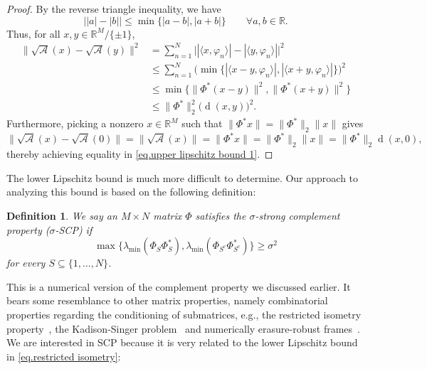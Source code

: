 \documentclass[times,10pt]{elsarticle}
\theoremstyle{plain}
\newtheorem{definition}[theorem]{Definition}
\begin{document}
\begin{proof}
By the reverse triangle inequality, we have
\begin{equation*}
\big||a|-|b|\big|
\leq\min\big\{|a-b|,|a+b|\big\}
\qquad
\forall a,b\in\mathbb{R}.
\end{equation*}
Thus, for all $x,y\in\mathbb{R}^M/\{\pm1\}$,
\begin{align}
\nonumber
\|\sqrt{\mathcal{A}}(x)-\sqrt{\mathcal{A}}(y)\|^2
&=\sum_{n=1}^N\big||\langle x,\varphi_n\rangle|-|\langle y,\varphi_n\rangle|\big|^2\\
\nonumber
&\leq\sum_{n=1}^N\bigg(\min\Big\{|\langle x-y,\varphi_n\rangle|,|\langle x+y,\varphi_n\rangle|\Big\}\bigg)^2\\
\nonumber
&\leq\min\Big\{\|\Phi^*(x-y)\|^2,\|\Phi^*(x+y)\|^2\Big\}\\
\label{eq.upper lipschitz bound 1}
&\leq\|\Phi^*\|_2^2\big(\operatorname{d}(x,y)\big)^2.
\end{align}
Furthermore, picking a nonzero $x\in\mathbb{R}^M$ such that $\|\Phi^*x\|=\|\Phi^*\|_2\|x\|$ gives
\begin{equation*}
\|\sqrt{\mathcal{A}}(x)-\sqrt{\mathcal{A}}(0)\|
=\|\sqrt{\mathcal{A}}(x)\|
=\|\Phi^*x\|
=\|\Phi^*\|_2\|x\|
=\|\Phi^*\|_2\operatorname{d}(x,0),
\end{equation*}
thereby achieving equality in \eqref{eq.upper lipschitz bound 1}.
\qquad
\end{proof}

The lower Lipschitz bound is much more difficult to determine.
Our approach to analyzing this bound is based on the following definition:

\begin{definition}
We say an $M\times N$ matrix $\Phi$ satisfies the $\sigma$-strong complement property ($\sigma$-SCP) if 
\begin{equation*}
\max\big\{\lambda_{\mathrm{min}}(\Phi_S\Phi_S^*),\lambda_{\mathrm{min}}(\Phi_{S^\mathrm{c}}\Phi_{S^\mathrm{c}}^*)\big\}
\geq \sigma^2
\end{equation*}
for every $S\subseteq\{1,\ldots,N\}$.
\end{definition}

This is a numerical version of the complement property we discussed earlier.
It bears some resemblance to other matrix properties, namely combinatorial properties regarding the conditioning of submatrices, e.g., the restricted isometry property~\cite{Candes:08}, the Kadison-Singer problem~\cite{CasazzaFTW:06} and numerically erasure-robust frames~\cite{FickusM:12}.
We are interested in SCP because it is very related to the lower Lipschitz bound in \eqref{eq.restricted isometry}:
\end{document}

